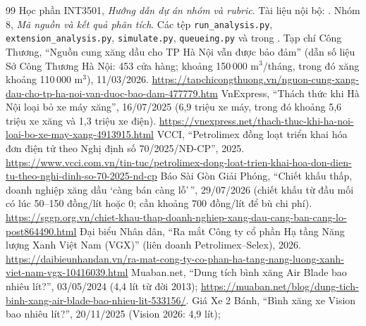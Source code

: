 
\FloatBarrier
\clearpage

\FloatBarrier
\clearpage

\FloatBarrier
\clearpage

{}
\begin{thebibliography}{99}
 Học phần INT3501, \textit{Hướng dẫn dự án nhóm và rubric}.
Tài liệu nội bộ: .
 Nhóm 8, \textit{Mã nguồn và kết quả phân tích}. Các tệp
\texttt{run\_analysis.py}, \texttt{extension\_analysis.py}, \texttt{simulate.py},
\texttt{queueing.py} và  trong .
 Tạp chí Công Thương, ``Nguồn cung xăng dầu cho TP Hà Nội vẫn được bảo đảm''
(dẫn số liệu Sở Công Thương Hà Nội: 453 cửa hàng; khoảng 150\,000 m$^3$/tháng, trong đó xăng
khoảng 110\,000 m$^3$), 11/03/2026. \url{https://tapchicongthuong.vn/nguon-cung-xang-dau-cho-tp-ha-noi-van-duoc-bao-dam-477779.htm}
 VnExpress, ``Thách thức khi Hà Nội loại bỏ xe máy xăng'', 16/07/2025 (6,9 triệu xe máy, trong đó khoảng 5,6 triệu xe xăng và 1,3 triệu xe điện).
\url{https://vnexpress.net/thach-thuc-khi-ha-noi-loai-bo-xe-may-xang-4913915.html}
 VCCI, ``Petrolimex đồng loạt triển khai hóa đơn điện tử theo Nghị định số
70/2025/NĐ-CP'', 2025. \url{https://www.vcci.com.vn/tin-tuc/petrolimex-dong-loat-trien-khai-hoa-don-dien-tu-theo-nghi-dinh-so-70-2025-nd-cp}
 Báo Sài Gòn Giải Phóng, ``Chiết khấu thấp, doanh nghiệp xăng dầu `càng bán càng lỗ'\,'', 29/07/2026
(chiết khấu từ đầu mối có lúc 50--150 đồng/lít hoặc 0; cần khoảng 700 đồng/lít để bù chi phí).
\url{https://sggp.org.vn/chiet-khau-thap-doanh-nghiep-xang-dau-cang-ban-cang-lo-post864490.html}
 Đại biểu Nhân dân, ``Ra mắt Công ty cổ phần Hạ tầng Năng lượng Xanh Việt Nam (VGX)'' (liên doanh Petrolimex--Selex), 2026.
\url{https://daibieunhandan.vn/ra-mat-cong-ty-co-phan-ha-tang-nang-luong-xanh-viet-nam-vgx-10416039.html}
 Muaban.net, ``Dung tích bình xăng Air Blade bao nhiêu lít?'', 03/05/2024 (4,4 lít từ đời 2013);
\url{https://muaban.net/blog/dung-tich-binh-xang-air-blade-bao-nhieu-lit-533156/}.
Giá Xe 2 Bánh, ``Bình xăng xe Vision bao nhiêu lít?'', 20/11/2025 (Vision 2026: 4,9 lít);

\end{thebibliography}

